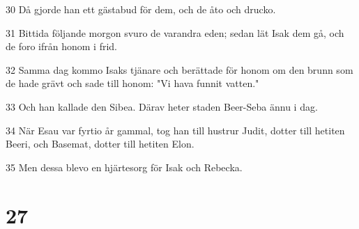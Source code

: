 \par 30 Då gjorde han ett gästabud för dem, och de åto och drucko.
\par 31 Bittida följande morgon svuro de varandra eden; sedan lät Isak dem gå, och de foro ifrån honom i frid.
\par 32 Samma dag kommo Isaks tjänare och berättade för honom om den brunn som de hade grävt och sade till honom: "Vi hava funnit vatten."
\par 33 Och han kallade den Sibea. Därav heter staden Beer-Seba ännu i dag.
\par 34 När Esau var fyrtio år gammal, tog han till hustrur Judit, dotter till hetiten Beeri, och Basemat, dotter till hetiten Elon.
\par 35 Men dessa blevo en hjärtesorg för Isak och Rebecka.

\chapter{27}

